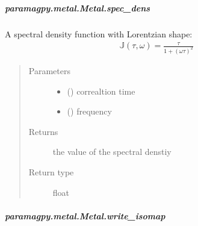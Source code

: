 \documentclass[a4paper,10pt,english]{sphinxmanual}
\begin{document}
\begin{fulllineitems}
\begin{fulllineitems}
\begin{fulllineitems}
\end{fulllineitems}



\subparagraph{paramagpy.metal.Metal.spec\_dens}
\label{\detokenize{reference/generated/paramagpy.metal.Metal.spec_dens:paramagpy-metal-metal-spec-dens}}\label{\detokenize{reference/generated/paramagpy.metal.Metal.spec_dens::doc}}

\begin{fulllineitems}
\label{\detokenize{reference/generated/paramagpy.metal.Metal.spec_dens:paramagpy.metal.Metal.spec_dens}}
A spectral density function with Lorentzian shape:
\begin{equation*}
\begin{split}\mathbb{J}(\tau,\omega)=\frac{\tau}{1+(\omega\tau)^2}\end{split}
\end{equation*}\begin{quote}\begin{description}
\item[{Parameters}] \leavevmode\begin{itemize}
\item {} 
 () \textendash{} correaltion time

\item {} 
 () \textendash{} frequency

\end{itemize}

\item[{Returns}] \leavevmode
{} \textendash{} the value of the spectral denstiy

\item[{Return type}] \leavevmode
float

\end{description}\end{quote}

\end{fulllineitems}



\subparagraph{paramagpy.metal.Metal.write\_isomap}
\label{\detokenize{reference/generated/paramagpy.metal.Metal.write_isomap:paramagpy-metal-metal-write-isomap}}\label{\detokenize{reference/generated/paramagpy.metal.Metal.write_isomap::doc}}


\end{fulllineitems}
\end{fulllineitems}
\end{document}
